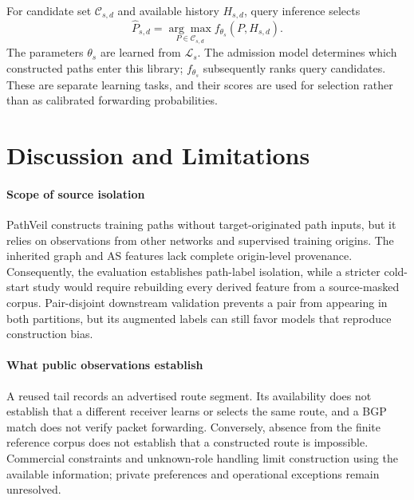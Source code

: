 \documentclass[conference]{IEEEtran}
\newcommand{\sys}{\mbox{PathVeil}\xspace}
\begin{document}
For candidate set $\mathcal C_{s,d}$ and available history $H_{s,d}$,
query inference selects
\begin{equation}
\widehat P_{s,d}=\underset{P\in\mathcal C_{s,d}}{\arg\max}
 f_{\theta_s}(P,H_{s,d}).
\label{eq:query_score}
\end{equation}
The parameters $\theta_s$ are learned from $\mathcal L_s$.
The admission model determines which constructed paths enter this
library; $f_{\theta_s}$ subsequently ranks query candidates. These are
separate learning tasks, and their scores are used for selection rather
than as calibrated forwarding probabilities.





\section{Discussion and Limitations}
\label{sec:discussion}

\paragraph{Scope of source isolation}
\sys constructs training paths without target-originated path inputs,
but it relies on observations from other networks and supervised
training origins. The inherited graph and AS features lack complete
origin-level provenance. Consequently, the evaluation establishes
path-label isolation, while a stricter cold-start study would require
rebuilding every derived feature from a source-masked corpus.
Pair-disjoint downstream validation prevents a pair from appearing in
both partitions, but its augmented labels can still favor models that
reproduce construction bias.

\paragraph{What public observations establish}
A reused tail records an advertised route segment. Its availability
does not establish that a different receiver learns or selects the same
route, and a BGP match does not verify packet forwarding. Conversely,
absence from the finite reference corpus does not establish that a
constructed route is impossible. Commercial constraints and unknown-role
handling limit construction using the available information; private
preferences and operational exceptions remain unresolved.
\end{document}
